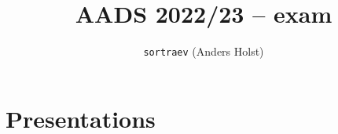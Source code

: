 \documentclass{article}
\author{\texttt{sortraev} (Anders Holst)}
\title{AADS 2022/23 -- exam
  \ifdef{\notes}{
    \ifdef{\presentations}{
      notes\\ and presentations
    }
    { %
      notes
    }
  }{
    presentations
  }
}
\begin{document}
\maketitle
\newpage
\tableofcontents
\newpage


\ifdef{\presentations}
{
\section{Presentations}









}{}
\end{document}
